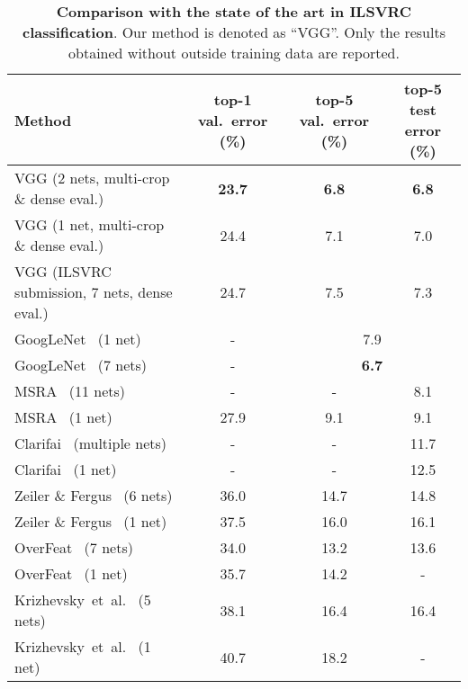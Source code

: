 \documentclass{article} %
\makeatletter
\newcommand*{\etal}{et~al.\@\xspace}
\makeatother
\begin{document}
\begin{table}[htb]
\setlength{\tabcolsep}{2pt}
\small
\centering
\caption{\textbf{Comparison with the state of the art in ILSVRC classification}. Our method is denoted as ``VGG''.
Only the results obtained without outside training data are reported.
}
\begin{tabular}{|l|c|c|c|} \hline
Method & top-1 val.\ error (\%) & top-5 val.\ error (\%) & top-5 test error (\%) \\ \hline
VGG (2 nets, multi-crop \& dense eval.) & \textbf{23.7} & \textbf{6.8} & \textbf{6.8} \\ \hline
VGG (1 net, multi-crop \& dense eval.) & 24.4 & 7.1 & 7.0 \\ \hline\hline
VGG (ILSVRC submission, 7 nets, dense eval.) & 24.7 & 7.5 & 7.3 \\ \hline\hline
GoogLeNet~\citep{Szegedy14} (1 net) & - & \multicolumn{2}{c|}{7.9} \\ \hline
GoogLeNet~\citep{Szegedy14} (7 nets) & - & \multicolumn{2}{c|}{\textbf{6.7}} \\ \hline
MSRA~\citep{He14} (11 nets) & - & - & 8.1 \\ \hline
MSRA~\citep{He14} (1 net) & 27.9 & 9.1 & 9.1 \\ \hline
Clarifai~\citep{Russakovsky14} (multiple nets) & -  & - & 11.7 \\ \hline
Clarifai~\citep{Russakovsky14} (1 net) & - & - & 12.5 \\ \hline
Zeiler \& Fergus~\citep{Zeiler13} (6 nets) & 36.0 & 14.7 & 14.8 \\ \hline
Zeiler \& Fergus~\citep{Zeiler13} (1 net) & 37.5 & 16.0 & 16.1 \\ \hline
OverFeat~\citep{Sermanet14} (7 nets) & 34.0 & 13.2 & 13.6 \\ \hline
OverFeat~\citep{Sermanet14} (1 net) & 35.7 & 14.2 & - \\ \hline
Krizhevsky~\etal~\citep{Krizhevsky12} (5 nets) & 38.1 & 16.4 & 16.4 \\ \hline
Krizhevsky~\etal~\citep{Krizhevsky12} (1 net) & 40.7 & 18.2 & - \\ \hline
\end{tabular}
\label{tab:SOA}
\end{table}
\end{document}
